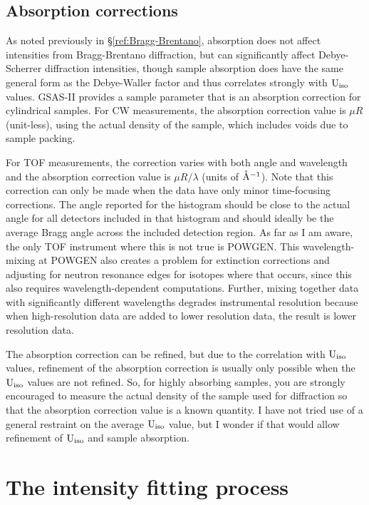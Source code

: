 \subsection{Absorption corrections}\label{ref:Absorption}
As noted previously in \S\ref{ref:Bragg-Brentano}, absorption does not affect intensities from Bragg-Brentano diffraction, but can significantly affect Debye-Scherrer diffraction intensities, though sample absorption does have the same general form as the Debye-Waller factor and thus correlates strongly with $\rm U_{iso}$ values. GSAS-II provides a sample parameter that is an absorption correction for cylindrical samples. For CW measurements, the absorption correction value is $\mu R$ (unit-less), using the actual density of the sample, which includes voids due to sample packing. 

For TOF measurements, the correction varies with both angle and wavelength and the absorption correction value is $\mu R/\lambda$ (units of $\mathring{\rm A}^{-1}$). Note that this correction can only be made when the data have only minor time-focusing corrections. The angle reported for the histogram should be close to the actual angle for all detectors included in that histogram and should ideally be the average Bragg angle across the included detection region. As far as I am aware, the only TOF instrument where this is not true is POWGEN. This wavelength-mixing at POWGEN also creates a problem for extinction corrections and adjusting for neutron resonance edges for isotopes where that occurs, since this also requires wavelength-dependent computations. Further, mixing together data with significantly different wavelengths degrades instrumental resolution because when high-resolution data are added to lower resolution data, the result is lower resolution data. 

The absorption correction can be refined, but due to the correlation with $\rm U_{iso}$ values, refinement of the absorption correction is usually only possible when the  $\rm U_{iso}$ values are not refined. So, for highly absorbing samples, you are strongly encouraged to measure the actual  density of the sample used for diffraction so that the absorption correction value is a known quantity. I have not tried use of a general restraint on the average $\rm U_{iso}$ value, but I wonder if that would allow refinement of  $\rm U_{iso}$ and sample absorption. 

\section{The intensity fitting process}

